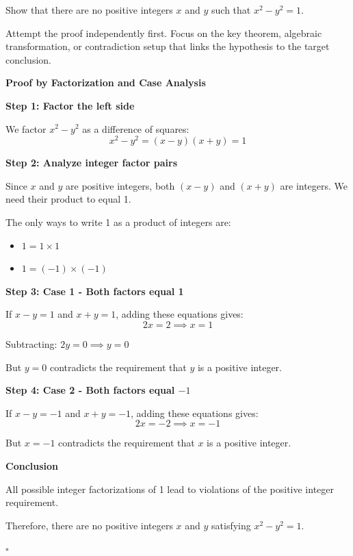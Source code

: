 
\begin{problem}
Show that there are no positive integers $x$ and $y$ such that $x^2 - y^2 = 1$.
\end{problem}

\begin{hint}
Attempt the proof independently first. Focus on the key theorem, algebraic transformation, or contradiction setup that links the hypothesis to the target conclusion.
\end{hint}

\begin{solution}
\textbf{Proof by Factorization and Case Analysis}

\textbf{Step 1: Factor the left side}

We factor $x^2 - y^2$ as a difference of squares:
\[ x^2 - y^2 = (x-y)(x+y) = 1 \]

\textbf{Step 2: Analyze integer factor pairs}

Since $x$ and $y$ are positive integers, both $(x-y)$ and $(x+y)$ are integers. We need their product to equal 1.

The only ways to write 1 as a product of integers are:
\begin{itemize}
    \item $1 = 1 \times 1$
    \item $1 = (-1) \times (-1)$
\end{itemize}

\textbf{Step 3: Case 1 - Both factors equal 1}

If $x - y = 1$ and $x + y = 1$, adding these equations gives:
\[ 2x = 2 \implies x = 1 \]

Subtracting: $2y = 0 \implies y = 0$

But $y = 0$ contradicts the requirement that $y$ is a positive integer.

\textbf{Step 4: Case 2 - Both factors equal $-1$}

If $x - y = -1$ and $x + y = -1$, adding these equations gives:
\[ 2x = -2 \implies x = -1 \]

But $x = -1$ contradicts the requirement that $x$ is a positive integer.

\textbf{Conclusion}

All possible integer factorizations of 1 lead to violations of the positive integer requirement.

Therefore, there are no positive integers $x$ and $y$ satisfying $x^2 - y^2 = 1$.

\hfill $\square$
\end{solution}

